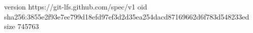 version https://git-lfs.github.com/spec/v1
oid sha256:3855e2f93e7ec799d18efd97ef3d2d35ea254dacd87169662d6f783d548233ed
size 745763
